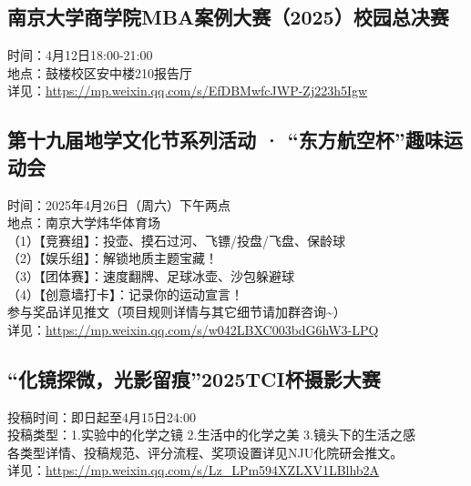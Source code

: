 \documentclass[letterpaper, 12pt]{article}
\begin{document}
\begin{multicols}{2}
\subsection{南京大学商学院MBA案例大赛（2025）校园总决赛}
时间：4月12日18:00-21:00
\\地点：鼓楼校区安中楼210报告厅
\\详见：\url{https://mp.weixin.qq.com/s/EfDBMwfcJWP-Zj223h5Igw}

\subsection{第十九届地学文化节系列活动 · “东方航空杯”趣味运动会}
时间：2025年4月26日（周六）下午两点
\\地点：南京大学炜华体育场
\\（1）【竞赛组】：投壶、摸石过河、飞镖/投盘/飞盘、保龄球
\\（2）【娱乐组】：解锁地质主题宝藏！
\\（3）【团体赛】：速度翻牌、足球冰壶、沙包躲避球
\\（4）【创意墙打卡】：记录你的运动宣言！
\\参与奖品详见推文（项目规则详情与其它细节请加群咨询\textasciitilde{}）
\\详见：\url{https://mp.weixin.qq.com/s/w042LBXC003bdG6hW3-LPQ}

\subsection{“化镜探微，光影留痕”2025TCI杯摄影大赛}
投稿时间：即日起至4月15日24:00
\\投稿类型：1.实验中的化学之镜 2.生活中的化学之美 3.镜头下的生活之感
\\各类型详情、投稿规范、评分流程、奖项设置详见NJU化院研会推文。
\\详见：\url{https://mp.weixin.qq.com/s/Lz_LPm594XZLXV1LBlhb2A}



\end{multicols}
\end{document}

